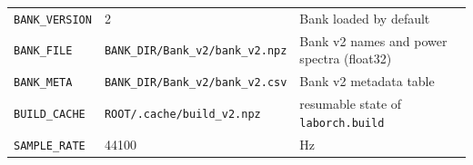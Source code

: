 \documentclass[
  10pt,
]{article}
\begin{document}
\begin{longtable}[]{@{}lll@{}}
\begin{minipage}[t]{0.30\columnwidth}
\texttt{BANK\_VERSION}\strut
\end{minipage} &
\begin{minipage}[t]{0.30\columnwidth}\raggedright
2\strut
\end{minipage} &
\begin{minipage}[t]{0.30\columnwidth}\raggedright
Bank loaded by default\strut
\end{minipage}\tabularnewline
\begin{minipage}[t]{0.30\columnwidth}\raggedright
\texttt{BANK\_FILE}\strut
\end{minipage} &
\begin{minipage}[t]{0.30\columnwidth}\raggedright
\texttt{BANK\_DIR/Bank\_v2/bank\_v2.npz}\strut
\end{minipage} &
\begin{minipage}[t]{0.30\columnwidth}\raggedright
Bank v2 names and power spectra (float32)\strut
\end{minipage}\tabularnewline
\begin{minipage}[t]{0.30\columnwidth}\raggedright
\texttt{BANK\_META}\strut
\end{minipage} &
\begin{minipage}[t]{0.30\columnwidth}\raggedright
\texttt{BANK\_DIR/Bank\_v2/bank\_v2.csv}\strut
\end{minipage} &
\begin{minipage}[t]{0.30\columnwidth}\raggedright
Bank v2 metadata table\strut
\end{minipage}\tabularnewline
\begin{minipage}[t]{0.30\columnwidth}\raggedright
\texttt{BUILD\_CACHE}\strut
\end{minipage} &
\begin{minipage}[t]{0.30\columnwidth}\raggedright
\texttt{ROOT/.cache/build\_v2.npz}\strut
\end{minipage} &
\begin{minipage}[t]{0.30\columnwidth}\raggedright
resumable state of \texttt{laborch.build}\strut
\end{minipage}\tabularnewline
\begin{minipage}[t]{0.30\columnwidth}\raggedright
\texttt{SAMPLE\_RATE}\strut
\end{minipage} &
\begin{minipage}[t]{0.30\columnwidth}\raggedright
44100\strut
\end{minipage} &
\begin{minipage}[t]{0.30\columnwidth}\raggedright
Hz\strut
\end{minipage}\tabularnewline

\end{longtable}
\end{document}

